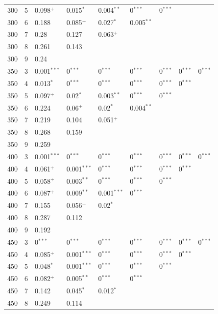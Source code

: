\documentclass[12pt,]{article}
\begin{document}
\begin{longtable}{rrlllllll}
300 & 5 & 0.098$^+$ & 0.015$^*$ & 0.004$^{**}$ & 0$^{***}$ & 0$^{***}$ &  & \\
300 & 6 & 0.188 & 0.085$^+$ & 0.027$^*$ & 0.005$^{**}$ &  &  & \\
300 & 7 & 0.28 & 0.127 & 0.063$^+$ &  &  &  & \\
300 & 8 & 0.261 & 0.143 &  &  &  &  & \\
300 & 9 & 0.24 &  &  &  &  &  & \\
350 & 3 & 0.001$^{***}$ & 0$^{***}$ & 0$^{***}$ & 0$^{***}$ & 0$^{***}$ & 0$^{***}$ & 0$^{***}$\\
350 & 4 & 0.013$^*$ & 0$^{***}$ & 0$^{***}$ & 0$^{***}$ & 0$^{***}$ & 0$^{***}$ & \\
350 & 5 & 0.097$^+$ & 0.02$^*$ & 0.003$^{**}$ & 0$^{***}$ & 0$^{***}$ &  & \\
350 & 6 & 0.224 & 0.06$^+$ & 0.02$^*$ & 0.004$^{**}$ &  &  & \\
350 & 7 & 0.219 & 0.104 & 0.051$^+$ &  &  &  & \\
350 & 8 & 0.268 & 0.159 &  &  &  &  & \\
350 & 9 & 0.259 &  &  &  &  &  & \\
400 & 3 & 0.001$^{***}$ & 0$^{***}$ & 0$^{***}$ & 0$^{***}$ & 0$^{***}$ & 0$^{***}$ & 0$^{***}$\\
400 & 4 & 0.061$^+$ & 0.001$^{***}$ & 0$^{***}$ & 0$^{***}$ & 0$^{***}$ & 0$^{***}$ & \\
400 & 5 & 0.058$^+$ & 0.003$^{**}$ & 0$^{***}$ & 0$^{***}$ & 0$^{***}$ &  & \\
400 & 6 & 0.087$^+$ & 0.009$^{**}$ & 0.001$^{***}$ & 0$^{***}$ &  &  & \\
400 & 7 & 0.155 & 0.056$^+$ & 0.02$^*$ &  &  &  & \\
400 & 8 & 0.287 & 0.112 &  &  &  &  & \\
400 & 9 & 0.192 &  &  &  &  &  & \\
450 & 3 & 0$^{***}$ & 0$^{***}$ & 0$^{***}$ & 0$^{***}$ & 0$^{***}$ & 0$^{***}$ & 0$^{***}$\\
450 & 4 & 0.085$^+$ & 0.001$^{***}$ & 0$^{***}$ & 0$^{***}$ & 0$^{***}$ & 0$^{***}$ & \\
450 & 5 & 0.048$^*$ & 0.001$^{***}$ & 0$^{***}$ & 0$^{***}$ & 0$^{***}$ &  & \\
450 & 6 & 0.082$^+$ & 0.005$^{**}$ & 0$^{***}$ & 0$^{***}$ &  &  & \\
450 & 7 & 0.142 & 0.045$^*$ & 0.012$^*$ &  &  &  & \\
450 & 8 & 0.249 & 0.114 &  &  &  &  & \\

\end{longtable}
\end{document}
